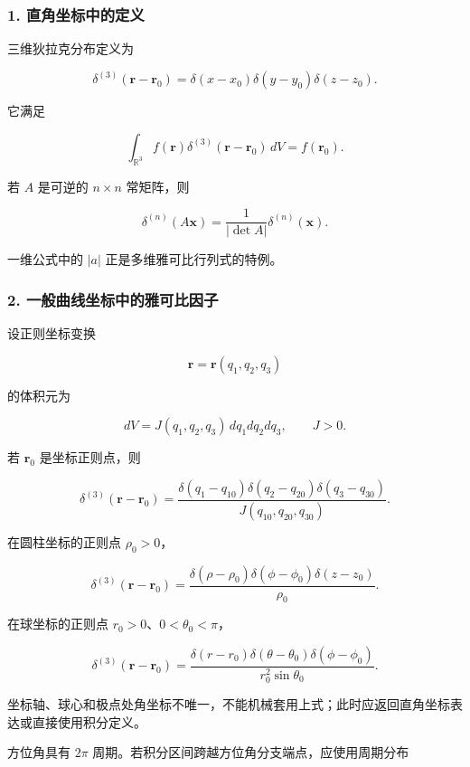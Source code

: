 \subsubsection{1.
直角坐标中的定义}\label{m1:ux76f4ux89d2ux5750ux6807ux4e2dux7684ux5b9aux4e49}

三维狄拉克分布定义为

\[
\boxed{
\delta^{(3)}(\mathbf r-\mathbf r_0)
=
\delta(x-x_0)\delta(y-y_0)\delta(z-z_0)
}.
\]

它满足

\[
\int_{\mathbb R^3}
f(\mathbf r)
\delta^{(3)}(\mathbf r-\mathbf r_0)
\,dV
=f(\mathbf r_0).
\]

若 \(A\) 是可逆的 \(n\times n\) 常矩阵，则

\[
\boxed{
\delta^{(n)}(A\mathbf x)
=
\frac1{|\det A|}
\delta^{(n)}(\mathbf x)
}.
\]

一维公式中的 \(|a|\) 正是多维雅可比行列式的特例。

\subsubsection{2.
一般曲线坐标中的雅可比因子}\label{m1:ux4e00ux822cux66f2ux7ebfux5750ux6807ux4e2dux7684ux96c5ux53efux6bd4ux56e0ux5b50}

设正则坐标变换

\[
\mathbf r=\mathbf r(q_1,q_2,q_3)
\]

的体积元为

\[
dV=J(q_1,q_2,q_3)\,dq_1dq_2dq_3,
\qquad J>0.
\]

若 \(\mathbf r_0\) 是坐标正则点，则

\[
\boxed{
\delta^{(3)}(\mathbf r-\mathbf r_0)
=
\frac{
\delta(q_1-q_{10})
\delta(q_2-q_{20})
\delta(q_3-q_{30})
}{J(q_{10},q_{20},q_{30})}
}.
\]

在圆柱坐标的正则点 \(\rho_0>0\)，

\[
\delta^{(3)}(\mathbf r-\mathbf r_0)
=
\frac{
\delta(\rho-\rho_0)
\delta(\phi-\phi_0)
\delta(z-z_0)
}{\rho_0}.
\]

在球坐标的正则点 \(r_0>0\)、\(0<\theta_0<\pi\)，

\[
\delta^{(3)}(\mathbf r-\mathbf r_0)
=
\frac{
\delta(r-r_0)
\delta(\theta-\theta_0)
\delta(\phi-\phi_0)
}{r_0^2\sin\theta_0}.
\]

坐标轴、球心和极点处角坐标不唯一，不能机械套用上式；此时应返回直角坐标表达或直接使用积分定义。

方位角具有 \(2\pi\) 周期。若积分区间跨越方位角分支端点，应使用周期分布

